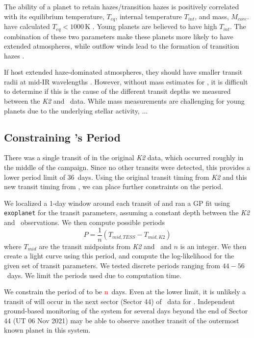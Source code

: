 \documentclass[twocolumn]{aastex631}
\begin{document}
The ability of a planet to retain hazes/transition hazes is positively correlated with its equilibrium temperature, $T_{eq}$, internal temperature $T_{int}$, and mass, $M_{core}$. \allplanets have calculated $T_{eq}<1000$\,K \citep{David2019a}. Young planets are believed to have high $T_{int}$. The combination of these two parameters make these planets more likely to have extended atmospheres, while outflow winds lead to the formation of transition hazes \citep{gao20}. 

If \allplanets host extended haze-dominated atmospheres, they should have smaller transit radii at mid-IR wavelengths \citep{gao20}. However, without mass estimates for \allplanets, it is difficult to determine if this is the cause of the different transit depths we measured between the \textit{K2} and \tess\ data. While mass measurements are challenging for young planets due to the underlying stellar activity,  ...


\subsection{Constraining \planete's Period}

There was a single transit of \planete in the original \textit{K2} data, which occurred roughly in the middle of the campaign. Since no other transits were detected, this provides a lower period limit of 36~days. Using the original transit timing from \textit{K2} and this new transit timing from \tess, we can place further constraints on the period. 

We localized a 1-day window around each transit of \planete and ran a GP fit using \texttt{exoplanet} for the transit parameters, assuming a constant depth between the \textit{K2} and \tess\ observations. We then compute possible periods 
\begin{equation}
    P = \frac{1}{n} \left(T_{mid,TESS} - T_{mid, K2}\right)
\end{equation}
where $T_{mid}$ are the transit midpoints from \textit{K2} and \tess\ and $n$ is an integer. We then create a light curve using this period, and compute the log-likelihood for the given set of transit parameters. We tested discrete periods ranging from $44- 56$~days. We limit the periods used due to computation time.

We constrain the period of \planete to be \textcolor{red}{n}~days. Even at the lower limit, it is unlikely a transit of \planete will occur in the next sector (Sector 44) of \tess\ data for \sname. Independent ground-based monitoring of the system for several days beyond the end of Sector 44 (UT 06 Nov 2021) may be able to observe another transit of the outermost known planet in this system.
\end{document}

